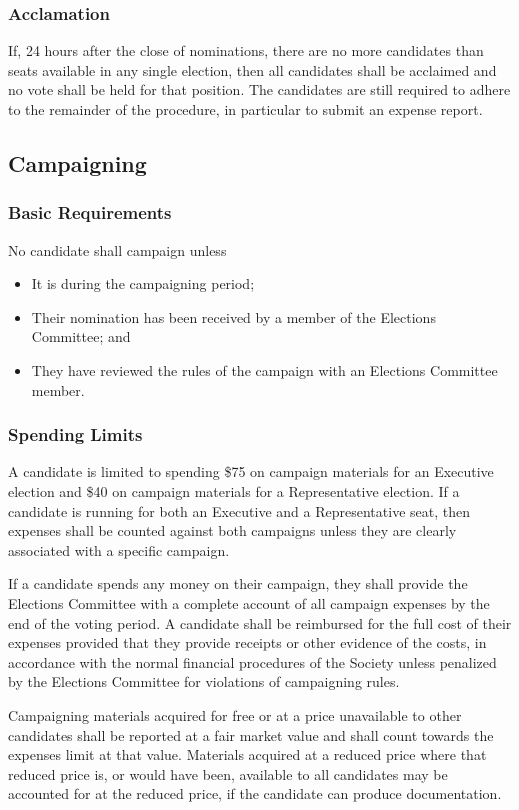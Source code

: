 \subsubsection{Acclamation}
If, 24 hours after the close of nominations, there are no more candidates than seats available in any single election, then all candidates shall be acclaimed and no vote shall be held for that position.
The candidates are still required to adhere to the remainder of the procedure, in particular to submit an expense report.

\subsection{Campaigning}
\subsubsection{Basic Requirements}
No candidate shall campaign unless
\begin{itemize}
	\item It is during the campaigning period;
	\item Their nomination has been received by a member of the Elections Committee; and
	\item They have reviewed the rules of the campaign with an Elections Committee member.
\end{itemize}

\subsubsection{Spending Limits}
A candidate is limited to spending \$75 on campaign materials for an Executive election and \$40 on campaign materials for a Representative election.
If a candidate is running for both an Executive and a Representative seat, then expenses shall be counted against both campaigns unless they are clearly associated with a specific campaign.

If a candidate spends any money on their campaign, they shall provide the Elections Committee with a complete account of all campaign expenses by the end of the voting period.
A candidate shall be reimbursed for the full cost of their expenses provided that they provide receipts or other evidence of the costs, in accordance with the normal financial procedures of the Society unless penalized by the  Elections Committee for violations of campaigning rules.

Campaigning materials acquired for free or at a price unavailable to other candidates shall be reported at a fair market value and shall count towards the expenses limit at that value.
Materials acquired at a reduced price where that reduced price is, or would have been, available to all candidates may be accounted for at the reduced price, if the candidate can produce documentation.

